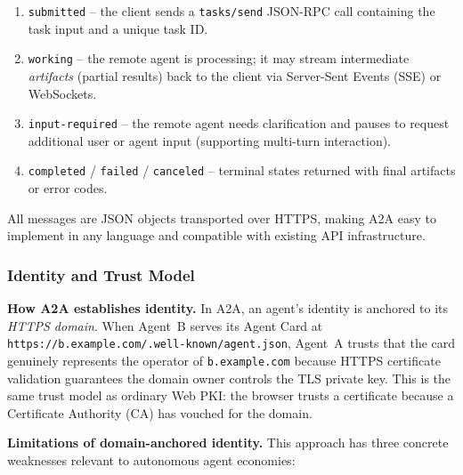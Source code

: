 \documentclass[conference]{IEEEtran}
\begin{document}
\begin{enumerate}
  \item \texttt{submitted} -- the client sends a \texttt{tasks/send}
    JSON-RPC call containing the task input and a unique task ID.
  \item \texttt{working} -- the remote agent is processing; it may
    stream intermediate \emph{artifacts} (partial results) back to the
    client via Server-Sent Events (SSE) or WebSockets.
  \item \texttt{input-required} -- the remote agent needs clarification
    and pauses to request additional user or agent input (supporting
    multi-turn interaction).
  \item \texttt{completed} / \texttt{failed} / \texttt{canceled} --
    terminal states returned with final artifacts or error codes.
\end{enumerate}

All messages are JSON objects transported over HTTPS, making A2A easy
to implement in any language and compatible with existing API
infrastructure.

\subsubsection{Identity and Trust Model}

\textbf{How A2A establishes identity.}
In A2A, an agent's identity is anchored to its \emph{HTTPS domain}.
When Agent~B serves its Agent Card at
\texttt{https://b.example.com/.well-known/agent.json}, Agent~A trusts
that the card genuinely represents the operator of
\texttt{b.example.com} because HTTPS certificate validation
guarantees the domain owner controls the TLS private key.  This is the
same trust model as ordinary Web PKI: the browser trusts a certificate
because a Certificate Authority (CA) has vouched for the domain.

\textbf{Limitations of domain-anchored identity.}
This approach has three concrete weaknesses relevant to autonomous
agent economies:
\end{document}
